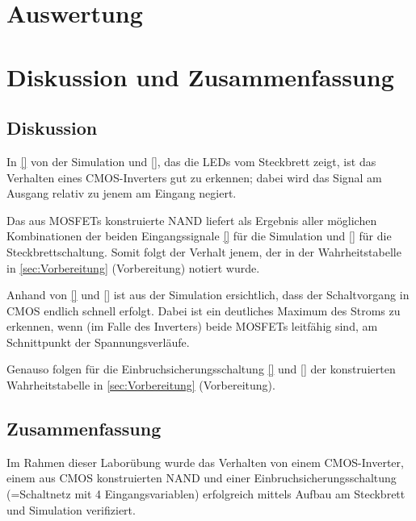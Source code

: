 \documentclass[12pt,english,ngerman]{scrartcl}
\begin{document}
\section{Auswertung}\label{sec:Auswertung}


\section{Diskussion und Zusammenfassung}\label{sec:Diskussion} 
\subsection{Diskussion}
In \autoref{} von der Simulation und \autoref{}, das die LEDs vom Steckbrett zeigt,
ist das Verhalten eines CMOS-Inverters gut zu erkennen; dabei wird das Signal
am Ausgang relativ zu jenem am Eingang negiert.

Das aus MOSFETs konstruierte NAND liefert als Ergebnis aller möglichen
Kombinationen der beiden Eingangssignale \autoref{} für die Simulation
und \autoref{} für die Steckbrettschaltung.
Somit folgt der Verhalt jenem, der in der Wahrheitstabelle in \autoref{sec:Vorbereitung}
(Vorbereitung) notiert wurde.

Anhand von \autoref{} und \autoref{} ist aus der Simulation ersichtlich, dass
der Schaltvorgang in CMOS endlich schnell erfolgt. Dabei ist ein deutliches
Maximum des Stroms zu erkennen, wenn (im Falle des Inverters) beide MOSFETs
leitfähig sind, am Schnittpunkt der Spannungsverläufe. 

Genauso folgen für die Einbruchsicherungsschaltung \autoref{} und \autoref{}
der konstruierten Wahrheitstabelle in \autoref{sec:Vorbereitung} (Vorbereitung).


\subsection{Zusammenfassung}
Im Rahmen dieser Laborübung wurde das Verhalten von einem CMOS-Inverter, einem aus CMOS konstruierten NAND und einer Einbruchsicherungsschaltung (=Schaltnetz mit 4 Eingangsvariablen) erfolgreich mittels Aufbau am Steckbrett und Simulation verifiziert.
\newpage

\printbibliography

\listoffigures

\listoftables
\end{document}

